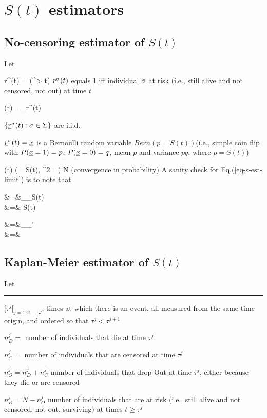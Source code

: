 \section{$S(t)$ estimators}

\subsection{No-censoring estimator of $S(t)$}

Let


\beq
r^\s(t) =  \indi(\tau^\s> t)
\eeq
$r^\sigma(t)$ equals 1 iff individual $\sigma$
at risk (i.e., still alive
and not censored, not out) at time $t$

\beq
{}(t) =\sum_\s r^\s(t)
\eeq

$\{{\underline{r}}^\sigma(t):\sigma\in\Sigma\}$ are i.i.d.

${\underline{r}}^\sigma(t)={\underline{x}}$ is
a Bernoulli random variable $Bern(p=S(t))$(i.e.,
simple coin flip with $P({\underline{x}}=1)=p$, $P({\underline{x}}=0)=q$,
mean $p$ and variance $pq$, where $p=S(t)$)

\beq
{}(t)\rarrow
\caln\left(
\mu =S(t), \s^2= \right)
N\rarrow \infty
\label{eq-s-est-limit}
\eeq
 (convergence in probability)
A sanity check for Eq.(\ref{eq-s-est-limit}) is to note that

\beqa
{}
&=&\sum_\s {}_{S(t)}
\\
&=&
S(t)
\eeqa


\beqa
{}
&=&\sum_\s \sum_{\s'}
\\
&=&
\eeqa

\subsection{Kaplan-Meier estimator of $S(t)$}
Let
\hrule
$[\tau^j[_{j=1,2, \ldots, J}$, times at
which there is an event, all measured
from the same time origin, and
ordered so that $\tau^j < \tau^{j+1}$

$n_D^j=$ number of individuals
that die  at time $\tau^j$


$n_C^j=$ number of individuals
that are censored at time $\tau^j$


$n_O^j=n_D^j+n_C^j$ number of individuals that drop-Out
at time $\tau^j$, either
because they die or are censored


$n_R^j=N-n_O^j$ number of individuals
that are at risk (i.e., still alive
and not censored, not out, surviving) at times $t\geq \tau^j$

